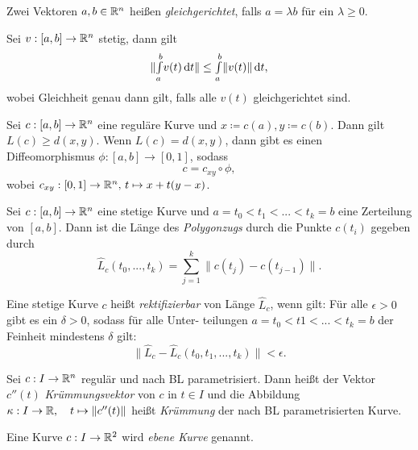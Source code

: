 \documentclass{cheat-sheet}
\newcommand{\Intabdt}[1]{\Int{a}{b}{#1}{t}}
\begin{document}
\begin{definition}
  Zwei Vektoren $a, b \in \mathbb{R}^n$ heißen \emph{gleichgerichtet}, falls $a = \lambda b$ für ein $\lambda \geq 0$.
\end{definition}

\begin{satz}
  Sei $v : [a, b] \to \mathbb{R}^n$ stetig, dann gilt
  \[ \| \Intabdt{v(t)} \| \leq \Intabdt{\|v(t)\|}, \]
  wobei Gleichheit genau dann gilt, falls alle $v(t)$ gleichgerichtet sind.
\end{satz}

\begin{satz}
  Sei $c : [a, b] \to \mathbb{R}^n$ eine reguläre Kurve und $x \coloneqq c(a), y \coloneqq c(b)$. Dann gilt $L(c) \geq d(x, y)$. Wenn $L(c) = d(x, y)$, dann gibt es einen Diffeomorphismus $\phi : [a, b] \to [0, 1]$, sodass
  \[ c = c_{xy} \circ \phi, \]
  wobei $c_{xy} : [0, 1] \to \mathbb{R}^n,\,t \mapsto x + t (y - x)$.
\end{satz}


\begin{definition}
  Sei $c : [a, b] \to \mathbb{R}^n$ eine stetige Kurve und $a = t_0 < t_1 < ... < t_k = b$ eine Zerteilung von $[a, b]$. Dann ist die Länge des \emph{Polygonzugs} durch die Punkte $c(t_i)$ gegeben durch
  \[ \hat{L}_c(t_0, ..., t_k) = \sum_{j=1}^k \| c(t_j) - c(t_{j-1}) \|. \]
\end{definition}

\begin{definition}
  Eine stetige Kurve $c$ heißt \emph{rektifizierbar} von Länge $\hat{L}_c$, wenn gilt: Für alle $\epsilon > 0$ gibt es ein $\delta > 0$, sodass für alle Unter- teilungen $a = t_0 < t1 < ... < t_k = b$ der Feinheit mindestens $\delta$ gilt:
  \[ \| \hat{L}_c - \hat{L}_c(t_0, t_1, ..., t_k) \| < \epsilon. \]
\end{definition}

\begin{definition}
  Sei $c : I \to \mathbb{R}^n$ regulär und nach BL parametrisiert. Dann heißt der Vektor $c''(t)$ \emph{Krümmungsvektor} von $c$ in $t \in I$ und die Abbildung $\kappa : I \to \mathbb{R}, \quad t \mapsto \| c''(t) \|$ heißt \emph{Krümmung} der nach BL parametrisierten Kurve.
\end{definition}

\begin{definition}
  Eine Kurve $c : I \to \mathbb{R}^2$ wird \emph{ebene Kurve} genannt.
\end{definition}
\end{document}
